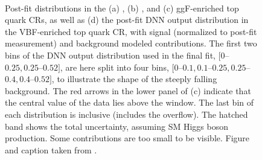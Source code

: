     \begin{figure}[htp]
        \centering
         \\
        \caption{
            Post-fit \mT distributions in the (a) \ZeroJet, (b) \OneJet, and (c) ggF-enriched \TwoJet top quark CRs, as well as (d) the post-fit DNN output distribution in the VBF-enriched \TwoJet top quark CR, with signal (normalized to post-fit measurement) and background modeled contributions.
            The first two bins of the DNN output distribution used in the final fit, $[0$--$0.25,0.25$--$0.52]$, are here split into four bins, $[0$--$0.1,0.1$--$0.25,0.25$--$0.4,0.4$--$0.52]$, to illustrate the shape of the steeply falling background.
            The red arrows in the lower panel of (c) indicate that the central value of the data lies above the window. The last bin of each \mT distribution is inclusive (includes the overflow).
            The hatched band shows the total uncertainty, assuming SM Higgs boson production.
            Some contributions are too small to be visible.
            Figure and caption taken from .
            \label{fig:Top_CRs}
        }
    \end{figure}
